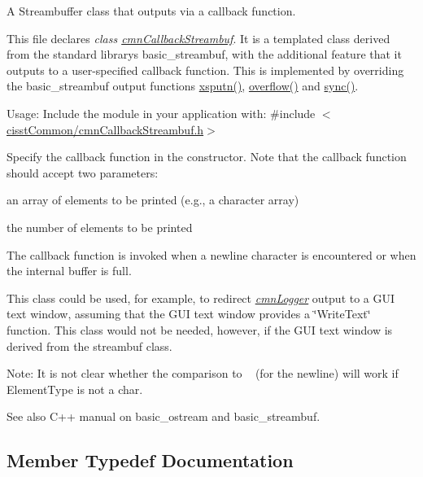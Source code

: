 A Streambuffer class that outputs via a callback function. 

This file declares {\itshape class \hyperlink{classcmn_callback_streambuf}{cmn\+Callback\+Streambuf}}. It is a templated class derived from the standard library\textquotesingle{}s basic\+\_\+streambuf, with the additional feature that it outputs to a user-\/specified callback function. This is implemented by overriding the basic\+\_\+streambuf output functions \hyperlink{classcmn_callback_streambuf_ac5b9db0adad90622d6681c085d296b6c}{xsputn()}, \hyperlink{classcmn_callback_streambuf_ab06c380ed8bfd927dc4a83b3f3a18a39}{overflow()} and \hyperlink{classcmn_callback_streambuf_a8a8beb77b32c7f2856092e656632ac7c}{sync()}.

Usage\+: Include the module in your application with\+: \#include $<$\hyperlink{cmn_callback_streambuf_8h}{cisst\+Common/cmn\+Callback\+Streambuf.\+h}$>$

Specify the callback function in the constructor. Note that the callback function should accept two parameters\+:
\begin{DoxyEnumerate}
\item an array of elements to be printed (e.\+g., a character array)
\item the number of elements to be printed
\end{DoxyEnumerate}

The callback function is invoked when a newline character is encountered or when the internal buffer is full.

This class could be used, for example, to redirect {\itshape \hyperlink{classcmn_logger}{cmn\+Logger}} output to a G\+U\+I text window, assuming that the G\+U\+I text window provides a \char`\"{}\+Write\+Text\char`\"{} function. This class would not be needed, however, if the G\+U\+I text window is derived from the streambuf class.

Note\+: It is not clear whether the comparison to \textquotesingle{}~\newline
\textquotesingle{} (for the newline) will work if Element\+Type is not a char.

\begin{DoxySeeAlso}{See also}
C++ manual on basic\+\_\+ostream and basic\+\_\+streambuf. 
\end{DoxySeeAlso}


\subsection{Member Typedef Documentation}
\hypertarget{classcmn_callback_streambuf_a606588225b2f37857213d2f3181119dd}{}

